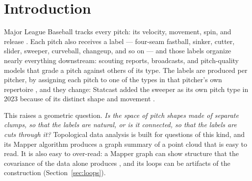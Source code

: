 \documentclass{article}
\theoremstyle{definition}
\theoremstyle{remark}
\begin{document}
\section{Introduction}
Major League Baseball tracks every pitch: its velocity, movement, spin, and release \parencite{savantcsvdocs}.
Each pitch also receives a label --- four-seam fastball, sinker, cutter, slider, sweeper, curveball, changeup, and so on \parencite{mlbglossary_pitchtypes} --- and those labels organize nearly everything downstream: scouting reports, broadcasts, and pitch-quality models that grade a pitch against others of its type.
The labels are produced per pitcher, by assigning each pitch to one of the types in that pitcher's own repertoire \parencite{paul2014patent,sharpe2020classification}, and they change: Statcast added the sweeper as its own pitch type in 2023 because of its distinct shape and movement \parencite{mlbglossary_sweeper}.

This raises a geometric question.
\emph{Is the space of pitch shapes made of separate clumps, so that the labels are natural, or is it connected, so that the labels are cuts through it?}
Topological data analysis is built for questions of this kind, and its Mapper algorithm \parencite{singh2007mapper} produces a graph summary of a point cloud that is easy to read.
It is also easy to over-read: a Mapper graph can show structure that the covariance of the data alone produces \parencite{topaz2026null}, and its loops can be artifacts of the construction (Section~\ref{sec:loops}).
\end{document}
